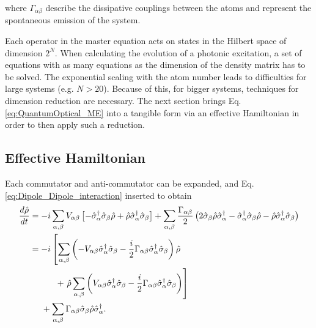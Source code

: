\noindent
where $ \Gamma_{\alpha\beta} $ describe the dissipative couplings between the atoms and represent the spontaneous emission of the system.

\noindent
Each operator in the master equation acts on states in the Hilbert space of dimension $2^N$.
When calculating the evolution of a photonic excitation,
a set of equations with as many equations as the dimension of the density matrix has to be solved.
The exponential scaling with the atom number leads to difficulties
for large systems (e.g. $  N > 20 $).
Because of this, for bigger systems, techniques for dimension
reduction are necessary.
The next section brings Eq.
\eqref{eq:QuantumOptical_ME}
into a tangible form via an effective Hamiltonian in order to then apply such a reduction.


\subsection{Effective Hamiltonian}\label{subsec:H_eff}
Each commutator and anti-commutator can be expanded, and Eq. \eqref{eq:Dipole_Dipole_interaction} inserted to obtain
\begin{equation}
\begin{aligned}
\frac{d\hat{\rho}}{dt} &= -i \sum_{\alpha , \beta} V_{\alpha\beta} \left[-  \hat{\sigma}_{\alpha}^{\dagger} \hat{\sigma}_{\beta} \hat{\rho} +  \hat{\rho} \hat{\sigma}_{\alpha}^{\dagger} \hat{\sigma}_{\beta} \right]
 + \sum_{\alpha,\beta} \frac{\Gamma_{\alpha\beta}}{2} \left( 2 \hat{\sigma}_{\beta} \hat{\rho} \hat{\sigma}_{\alpha}^\dagger - \hat{\sigma}_{\alpha}^\dagger \hat{\sigma}_{\beta} \hat{\rho} - \hat{\rho} \hat{\sigma}_{\alpha}^\dagger \hat{\sigma}_{\beta} \right)\\
&= -i \left[ \sum_{\alpha , \beta} \left( - V_{\alpha\beta} \hat{\sigma}_{\alpha}^{\dagger} \hat{\sigma}_{\beta} - \frac{i}{2} \Gamma_{\alpha\beta} \hat{\sigma}_{\alpha}^\dagger \hat{\sigma}_{\beta} \right) \hat{\rho} \right. \\
&\quad \quad \quad + \left. \hat{\rho} \sum_{\alpha , \beta} \left( V_{\alpha\beta}  \hat{\sigma}_{\alpha}^{\dagger} \hat{\sigma}_{\beta} - \frac{i}{2} \Gamma_{\alpha\beta} \hat{\sigma}_{\alpha}^\dagger \hat{\sigma}_{\beta} \right) \right] \\
&\hspace{0.48cm}   + \sum_{\alpha,\beta} \Gamma_{\alpha\beta} \hat{\sigma}_{\beta} \hat{\rho} \hat{\sigma}_{\alpha}^\dagger .
\end{aligned}
\end{equation}

